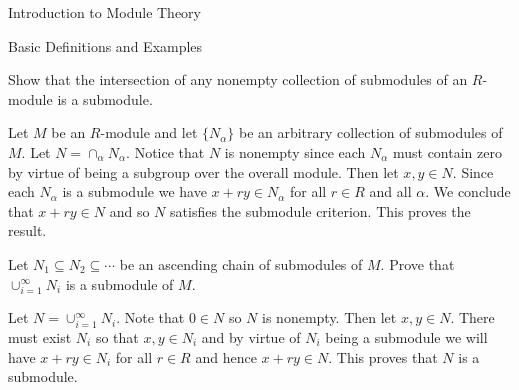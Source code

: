 \begin{chapter}{Introduction to Module Theory}
\begin{section}{Basic Definitions and Examples}
\begin{problem}\label{ex:10.1.6}
Show that the intersection of any nonempty collection of submodules of an $R$-module is a submodule.
\end{problem}
\begin{solution}
Let $M$ be an $R$-module and let $\{N_\alpha\}$ be an arbitrary collection of submodules of $M$. Let $N = \cap_{\alpha} N_\alpha$. Notice that $N$ is nonempty since each $N_\alpha$ must contain zero by virtue of being a subgroup over the overall module. Then let $x,y\in N$. Since each $N_\alpha$ is a submodule we have $x+ry\in N_\alpha$ for all $r\in R$ and all $\alpha$. We conclude that $x+ry\in N$ and so $N$ satisfies the submodule criterion. This proves the result.
\end{solution}\oneperpage



\begin{problem}\label{ex:10.1.7}
Let $N_1\subseteq N_2\subseteq \cdots$ be an ascending chain of submodules of $M$. Prove that $\cup_{i=1}^\infty N_i$ is a submodule of $M$.
\end{problem}
\begin{solution}
Let $N=\cup_{i=1}^\infty N_i$. Note that $0\in N$ so $N$ is nonempty. Then let $x,y\in N$. There must exist $N_i$ so that $x,y\in N_i$ and by virtue of $N_i$ being a submodule we will have $x+ry\in N_i$ for all $r\in R$ and hence $x+ry\in N$. This proves that $N$ is a submodule.

\end{solution}\oneperpage




\end{section}
\end{chapter}
